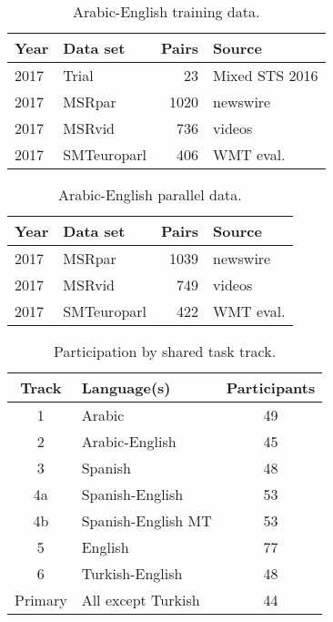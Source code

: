 \documentclass[11pt,a4paper]{article}
\begin{document}
\begin{table}[t]
\small
\begin{center}
\begin{tabular}{|l|l|r|l|} 
\hline
     Year & Data set         & Pairs &  Source\\
\hline
2017 & Trial & 23 & Mixed STS 2016 \\
2017 & MSRpar & 1020 & newswire\\
2017 & MSRvid & 736 & videos\\
2017 & SMTeuroparl & 406 & WMT eval.\\
\hline
\end{tabular}
\end{center}
\caption{Arabic-English training data.
}
\label{tab:ar-en-summary}
\end{table}

\begin{table}[t]
\small
\begin{center}
\begin{tabular}{|l|l|r|l|} 
\hline
     Year & Data set         & Pairs &  Source\\
\hline
2017 & MSRpar & 1039 & newswire\\
2017 & MSRvid & 749 & videos\\
2017 & SMTeuroparl & 422 & WMT eval.\\
\hline
\end{tabular}
\end{center}
\caption{Arabic-English parallel data.
}
\label{tab:ar-en-parallel}
\end{table}

\begin{table}[htp]
\begin{center}
\centering
\begin{tabular}{|c|l|c|}
\hline
  Track & Language(s) & Participants \\ 
\hline
  1 & Arabic & 49 \\
  2 & Arabic-English & 45 \\
  3 & Spanish & 48 \\
  4a & Spanish-English & 53 \\
  4b & Spanish-English MT & 53 \\
  5  & English & 77 \\
  6  & Turkish-English & 48 \\
\hline
  Primary & All except Turkish & 44 \\
\hline\end{tabular}

\end{center}
\caption{Participation by shared task track.}
\label{tab:participation}
\end{table}
\end{document}
